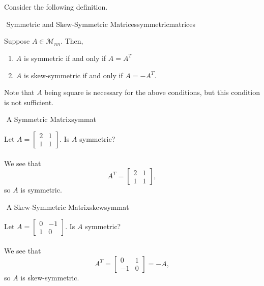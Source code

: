         \vphantom
        \\
        \\
        Consider the following definition.
        \begin{definition}{\Stop\,\,Symmetric and Skew-Symmetric Matrices}{symmetricmatrices}
        
            Suppose \(A\in\mathcal{M}_{nn}\). Then,
            \begin{enumerate}
                \item \(A\) is symmetric if and only if \(A=A^T\)
                \item \(A\) is skew-symmetric if and only if \(A=-A^T\).
            \end{enumerate}
            Note that \(A\) being square is necessary for the above conditions, but this condition is not sufficient.
        
        \end{definition}
        \begin{example}{\Difficulty\,\,A Symmetric Matrix}{symmat}
        
            Let \(A=\begin{bmatrix} 2 & 1 \\ 1 & 1\end{bmatrix}\). Is \(A\) symmetric?
            \\
            \\
            We see that
            \begin{equation*}
                A^T=\begin{bmatrix} 2 & 1 \\ 1 & 1\end{bmatrix},
            \end{equation*}
            so \(A\) is symmetric.
        
        \end{example}
        \pagebreak
        \begin{example}{\Difficulty\,\,A Skew-Symmetric Matrix}{skewsymmat}
        
            Let \(A=\begin{bmatrix} 0 & -1 \\ 1 & 0\end{bmatrix}\). Is \(A\) symmetric?
            \\
            \\
            We see that
            \begin{equation*}
                A^T=\begin{bmatrix} 0 & 1 \\ -1 & 0\end{bmatrix}=-A,
            \end{equation*}
            so \(A\) is skew-symmetric.
        
        \end{example}
